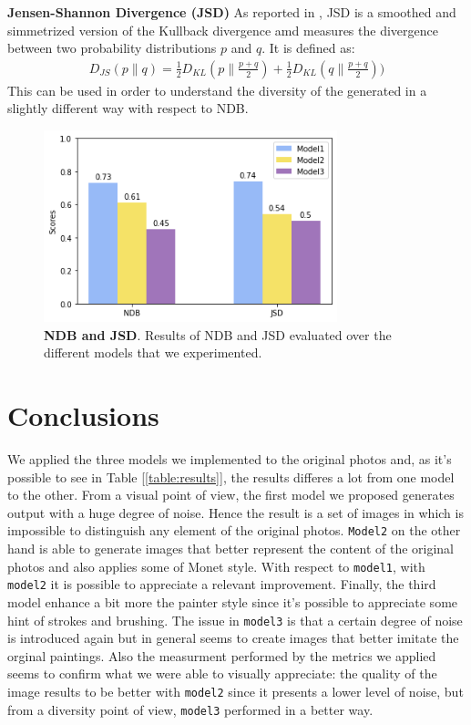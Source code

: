 \documentclass[10pt,twocolumn,letterpaper]{article}
\begin{document}
\textbf{Jensen-Shannon Divergence (JSD)} As reported in \cite{jsd}, JSD is a smoothed and simmetrized version of the Kullback divergence amd measures the divergence between two probability distributions $p$ and $q$. It is defined as: 
\begin{equation}
	\begin{split}
		D_{JS}(p\|q) = \frac{1}{2}D_{KL}(p\|\frac{p+q}{2})+  \frac{1}{2}D_{KL}(q\|\frac{p+q}{2}))
	\end{split}
\end{equation}
This can be used in order to understand the diversity of the generated in a slightly different way with respect to NDB.


\begin{figure}
	\includegraphics[width=23em]{index.png}
	\caption{\textbf{NDB and JSD}. Results of NDB and JSD evaluated over the different models that we experimented.}
	\label{figure:ndb-jsd}
\end{figure}

\section{Conclusions}
We applied the three models we implemented to the original photos and, as it's possible to see in Table [\ref{table:results}], the results differes a lot from one model to the other. From a visual point of view, the first model we proposed generates output with a huge degree of noise. Hence the result is a set of images in which is impossible to distinguish any element of the original photos. \texttt{Model2} on the other hand is able to generate images that better represent the content of the original photos and also applies some of Monet style. With respect to \texttt{model1}, with \texttt{model2} it is possible to appreciate a relevant improvement. Finally, the third model enhance a bit more the painter style since it's possible to appreciate some hint of strokes and brushing. The issue in \texttt{model3} is that a certain degree of noise is introduced again but in general seems to create images that better imitate the orginal paintings. Also the measurment performed by the metrics we applied seems to confirm what we were able to visually appreciate: the quality of the image results to be better with \texttt{model2} since it presents a lower level of noise, but from a diversity point of view, \texttt{model3} performed in a better way. 

{\small


}
\end{document}
